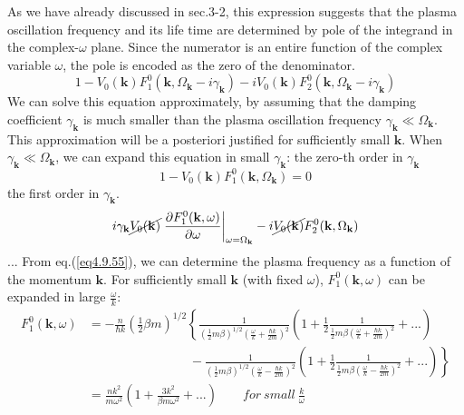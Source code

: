  As we have already discussed in sec.3-2, this expression suggests that the plasma oscillation frequency and its life time are determined by pole of the integrand in the complex-$\omega$ plane.
 Since the numerator is an entire function of the complex variable $\omega$, the pole is encoded as the zero of the denominator.
\begin{equation}
1-V_0(\mathbf k)F_1^0(\mathbf k,\Omega_{\mathbf k}-i\gamma_{\mathbf k}) -iV_0(\mathbf k)F_2^0(\mathbf k,\Omega_{\mathbf k}-i\gamma_{\mathbf k}) 
\end{equation}
 We can solve this equation approximately, by assuming that the damping coefficient $\gamma_{\mathbf k}$ is much smaller than the plasma oscillation frequency $\gamma_{\mathbf k}\ll \Omega_{\mathbf k}$.
 This approximation will be a posteriori justified for sufficiently small $\mathbf k$.
 When $\gamma_{\mathbf k}\ll \Omega_{\mathbf k}$, we can expand this equation in small $\gamma_{\mathbf k}$:
 the zero-th order in $\gamma_{\mathbf k}$
\begin{equation}\label{eq4.9.55}
1-V_0(\mathbf k)F_1^0(\mathbf k,\Omega_{\mathbf k})=0
\end{equation}
 the first order in $\gamma_{\mathbf k}$.
\begin{equation}
i\gamma_{\mathbf k}\cancel{V_0(\mathbf k)}\left.\frac{\partial F_1^0(\mathbf k,\omega)}{\partial \omega}\right|_{\omega=\Omega_{\mathbf k}}-i\cancel{V_0(\mathbf k)} F_2^0(\mathbf k,\Omega_{\mathbf k})
\end{equation}
 ...
 From eq.(\ref{eq4.9.55}), we can determine the plasma frequency as a function of the momentum $\mathbf k$.
 For sufficiently small $\mathbf k$ (with fixed $\omega$), $F_1^0(\mathbf k,\omega)$ can be expanded in large $\frac{\omega}{k}$:
\begin{equation}
\begin{aligned}
F_1^0(\mathbf k,\omega)&=-\frac{n}{\hbar k}\left( \frac{1}{2}\beta m \right)^{1/2} \left\{ \frac{1}{\left(\frac{1}{2}m\beta\right)^{1/2} \left( \frac{\omega}{k}+\frac{\hbar k}{2m} \right)^2}  \left(1+\frac{1}{2} \frac{1}{\frac{1}{2}m\beta \left( \frac{\omega}{k}+\frac{\hbar k}{2m} \right)^2} +...\right)  \right.\\
&\qquad\qquad\qquad\qquad-\left.\frac{1}{\left( \frac{1}{2}m\beta\right)^{1/2} \left( \frac{\omega}{k}-\frac{\hbar k}{2m} \right)^2} \left(1+\frac{1}{2} \frac{1}{\frac{1}{2}m\beta \left( \frac{\omega}{k}-\frac{\hbar k}{2m} \right)^2} +...\right)  \right\}\\
&=\frac{nk^2}{m\omega^2}\left( 1+\frac{3k^2}{\beta m\omega^2}+... \right)\qquad for\ small\ \frac{k}{\omega}
\end{aligned}
\end{equation}
